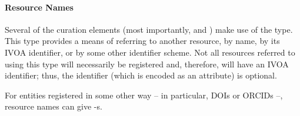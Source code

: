 \documentclass[11pt,a4paper]{ivoa}
\begin{document}

\paragraph{Resource Names}

Several of the curation elements (most importantly,
 and ) make use of the
 type.  This type provides a means of
referring to another resource, by name, by its IVOA
identifier, or by some other identifier scheme.
Not all resources referred to using this type will
necessarily be registered and, therefore, will have an IVOA identifier;
thus, the identifier (which is encoded as an attribute) is optional.

For entities registered in some other way -- in particular, DOIs or
ORCIDs --, resource names can give -s.
\end{document}
